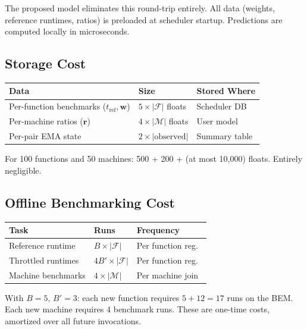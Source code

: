 \documentclass[11pt, a4paper]{article}
\newcommand{\bluecontentend}{\endgroup}
\begin{document}
The proposed model eliminates this round-trip entirely. All data
(weights, reference runtimes, ratios) is preloaded at scheduler
startup. Predictions are computed locally in microseconds.

\subsection{Storage Cost}

\begin{center}
\small
\begin{tabular}{@{}llp{3.2cm}@{}}
    \toprule
    Data & Size & Stored Where \\
    \midrule
    Per-function benchmarks
      ($t_{\mathrm{ref}}, \mathbf{w}$)
      & $5 \!\times\! |\mathcal{F}|$ floats
      & Scheduler DB \\
    Per-machine ratios ($\mathbf{r}$)
      & $4 \!\times\! |\mathcal{M}|$ floats
      & User model \\
    Per-pair EMA state
      & $2 \!\times\! |\text{observed}|$
      & Summary table \\
    \bottomrule
\end{tabular}
\end{center}

For 100 functions and 50 machines: 500 + 200 + (at most 10,000)
floats. Entirely negligible.

\subsection{Offline Benchmarking Cost}

\begin{center}
\small
\begin{tabular}{@{}lll@{}}
    \toprule
    Task & Runs & Frequency \\
    \midrule
    Reference runtime & $B \!\times\! |\mathcal{F}|$ & Per function reg.\ \\
    Throttled runtimes & $4B' \!\times\! |\mathcal{F}|$ & Per function reg.\ \\
    Machine benchmarks & $4 \!\times\! |\mathcal{M}|$ & Per machine join \\
    \bottomrule
\end{tabular}
\end{center}

With $B = 5$, $B' = 3$: each new function requires $5 + 12 = 17$
runs on the BEM. Each new machine requires 4 benchmark runs. These
are one-time costs, amortized over all future invocations.
\bluecontentend
\end{document}
